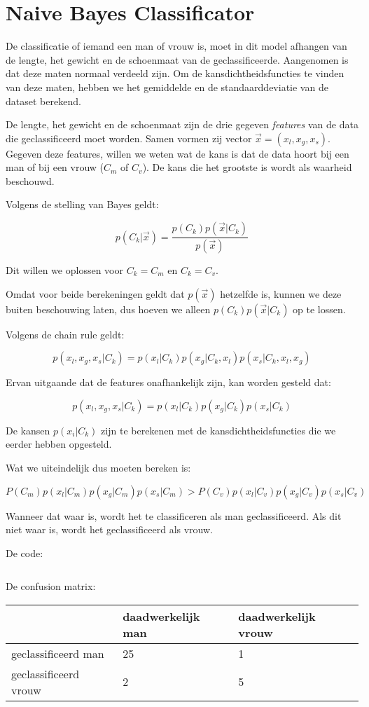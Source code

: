 \documentclass{article}
\begin{document}
\newpage

\section*{Naive Bayes Classificator}
De classificatie of iemand een man of vrouw is, moet in dit model afhangen van
de lengte, het gewicht en de schoenmaat van de geclassificeerde. Aangenomen is
dat deze maten normaal verdeeld zijn. Om de kansdichtheidsfuncties te vinden van
deze maten, hebben we het gemiddelde en de standaarddeviatie van de dataset
berekend.

De lengte, het gewicht en de schoenmaat zijn de drie gegeven \textit{features}
van de data die geclassificeerd moet worden. Samen vormen zij vector $\vec x =
(x_l,x_g,x_s)$. Gegeven deze features, willen we weten wat de kans is dat de
data hoort bij een man of bij een vrouw ($C_m$ of $C_v$). De kans die het
grootste is wordt als waarheid beschouwd.

Volgens de stelling van Bayes geldt:

$$ p(C_k|\vec x) = \frac{p(C_k)p(\vec x|C_k)}{p(\vec x)}$$

Dit willen we oplossen voor $C_k = C_m$ en $C_k = C_v$.

Omdat voor beide berekeningen geldt dat $p(\vec x)$ hetzelfde is, kunnen we deze
buiten beschouwing laten, dus hoeven we alleen $p(C_k)p(\vec x|C_k)$ op te
lossen.

Volgens de chain rule geldt:

$$p(x_l, x_g, x_s|C_k) = p(x_l|C_k)p(x_g|C_k,x_l)p(x_s|C_k,x_l,x_g)$$

Ervan uitgaande dat de features onafhankelijk zijn, kan worden gesteld dat:

$$p(x_l, x_g, x_s|C_k) = p(x_l|C_k)p(x_g|C_k)p(x_s|C_k)$$

De kansen $p(x_i|C_k)$ zijn te berekenen met de kansdichtheidsfuncties die we
eerder hebben opgesteld.

Wat we uiteindelijk dus moeten bereken is:

$$P(C_m)p(x_l|C_m)p(x_g|C_m)p(x_s|C_m) > P(C_v)p(x_l|C_v)p(x_g|C_v)p(x_s|C_v)$$

Wanneer dat waar is, wordt het te classificeren als man geclassificeerd. Als dit
niet waar is, wordt het geclassificeerd als vrouw.

De code:

\inputminted{python}{naive_noutf.py}

De confusion matrix:

\begin{table}[h]
\begin{tabular}{|l|l|l|}
\hline
                      & daadwerkelijk man & daadwerkelijk vrouw \\ \hline
geclassificeerd man   & 25                & 1                   \\ \hline
geclassificeerd vrouw & 2                 & 5                   \\ \hline
\end{tabular}
\end{table}
\end{document}
